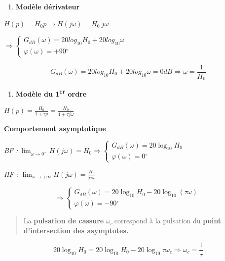 \begin{enumerate}
\def\labelenumi{\arabic{enumi}.}
\setcounter{enumi}{3}
\item
  \textbf{Modèle dérivateur}
\end{enumerate}

\(H(p) = H_{0}p \Longrightarrow H(j\omega) = H_{0}\ j\omega\)

\(\Rightarrow \left\{ \begin{array}{r}
G_{dB}(\omega) = 20{log_{10}}{H_{0} + 20{log_{10}}\omega} \\
\varphi(\omega) = + 90{^\circ}
\end{array} \right.\ \)

\[G_{dB}(\omega) = 20{log_{10}}H_{0} + 20{log_{10}}\omega = 0dB \Longrightarrow \omega = \frac{1}{H_{0}}\]

\begin{enumerate}
\def\labelenumi{\arabic{enumi}.}
\setcounter{enumi}{4}
\item
  \protect\hypertarget{_Toc99121126}{}{}\textbf{Modèle du 1\textsuperscript{er} ordre}
\end{enumerate}

\(H(p) = \frac{H_{0}}{1 + \tau p} = \frac{H_{0}}{1 + \tau j\omega}\)

\textbf{Comportement asymptotique}

\emph{BF :}\(\ \lim_{\omega \rightarrow 0^{+}}{H(j\omega)} = H_{0} \Longrightarrow \left\{ \begin{array}{r}
G_{dB}(\omega) = 20\log_{10}H_{0} \\
\varphi(\omega) = 0{^\circ}
\end{array} \right.\ \)

\emph{HF :} \(\lim_{\omega \rightarrow + \infty}{H(j\omega)} = \frac{H_{0}}{j\tau\omega}\)

\[\Longrightarrow \left\{ \begin{array}{r}
G_{dB}(\omega) = 20\log_{10}H_{0} - 20\log_{10}(\tau\omega) \\
\varphi(\omega) = - 90{^\circ}
\end{array} \right.\ \]

\begin{quote}
La \textbf{pulsation de cassure} \(\omega_{c}\ \)correspond à la pulsation du \textbf{point} \textbf{d'intersection des asymptotes.}
\end{quote}

\[20\log_{10}H_{0} = 20\log_{10}H_{0} - 20\log_{10}{\tau\omega_{c}} \Longrightarrow \omega_{c} = \frac{1}{\tau}\]

